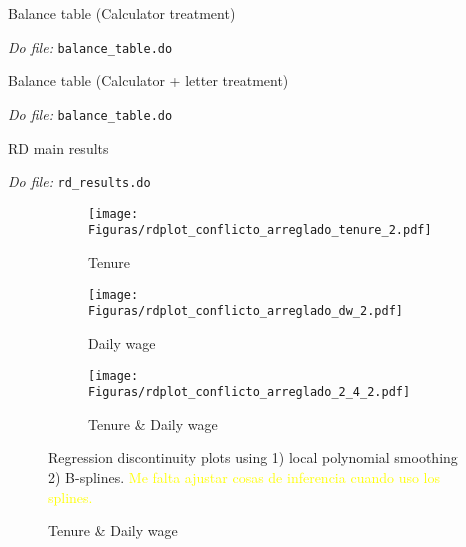 \documentclass[oneside,11pt]{article}
\begin{document}
\begin{landscape}
\begin{table}[H]
\caption{Balance table (Calculator treatment)}
\label{balance_table_t2_tenure}
\begin{center}
\resizebox{1.5\textwidth}{!}{
\scriptsize{}
}
\end{center}
 \scriptsize 
\textit{Do file: } \texttt{balance\_table.do}
\end{table}


\begin{table}[H]
\caption{Balance table (Calculator + letter treatment)}
\label{balance_table_t2_tenure}
\begin{center}
\resizebox{1.5\textwidth}{!}{
\scriptsize{}
}
\end{center}
 \scriptsize 
\textit{Do file: } \texttt{balance\_table.do}
\end{table}


\end{landscape}


\begin{table}[H]
\caption{RD main results}
\label{rd_sett_1}
\begin{center}
\scriptsize{}
\end{center}
 \scriptsize 
\textit{Do file: } \texttt{rd\_results.do}
\end{table}

\newpage

\begin{figure}[H]
     \caption{RD plots (Calculator treatment)}
    \label{rd_t2}
\begin{center}
\begin{subfigure}{0.31\textwidth}

\caption{Tenure}
        \texttt{[image: Figuras/rdplot\_conflicto\_arreglado\_tenure\_2.pdf]}
    \end{subfigure}
    \begin{subfigure}{0.31\textwidth}
\caption{Daily wage}
        \texttt{[image: Figuras/rdplot\_conflicto\_arreglado\_dw\_2.pdf]}
    \end{subfigure}        
    \begin{subfigure}{0.31\textwidth}
\caption{Tenure \& Daily wage}
        \texttt{[image: Figuras/rdplot\_conflicto\_arreglado\_2\_4\_2.pdf]}
    \end{subfigure}
  \end{center}
  
    \scriptsize Regression discontinuity plots using 1) local polynomial smoothing 2) B-splines. \textcolor{yellow}{Me falta ajustar cosas de inferencia cuando uso los splines.}
\end{figure}
\end{document}
